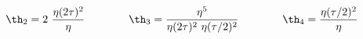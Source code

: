 \begin{equation} \label{theta-eta}
  \th_2 = 2~{\eta(2\tau)^2\over\eta} \qquad  \qquad 
  \th_3 = {\eta^5\over\eta(2\tau)^2~\eta(\tau/2)^2}  \qquad    \qquad 
  \th_4 = {\eta(\tau/2)^2\over\eta}
\end{equation} 
